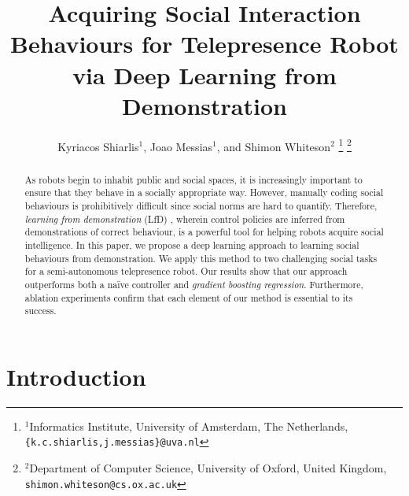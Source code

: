 \documentclass[letterpaper, 10 pt, conference]{ieeeconf}
\title{\LARGE \bf
Acquiring Social Interaction Behaviours for Telepresence Robot\\via Deep Learning from Demonstration 
}
\author{Kyriacos Shiarlis$^{1}$, Joao Messias$^{1}$, and Shimon Whiteson$^{2}$%
\thanks{$^{1}$Informatics Institute, University of Amsterdam, The Netherlands,
         {\tt\small \{k.c.shiarlis,j.messias\}@uva.nl}}%
\thanks{$^{2}$Department of Computer Science, University of Oxford, United Kingdom,
         {\tt\small shimon.whiteson@cs.ox.ac.uk}}%
}
\begin{document}
\maketitle

\thispagestyle{empty}
\pagestyle{empty}


\begin{abstract}
As robots begin to inhabit public and social spaces, it is increasingly important to ensure that they behave in a socially appropriate way. However, manually coding social behaviours is prohibitively difficult since social norms are hard to quantify.  Therefore, \emph{learning from demonstration} (LfD) \cite{argall2009survey}, wherein control policies are inferred from demonstrations of correct behaviour, is a powerful tool for helping robots acquire social intelligence. In this paper, we propose a deep learning approach to learning social behaviours from demonstration.  We apply this method to two challenging social tasks for a semi-autonomous telepresence robot.  Our results show that our approach outperforms both a naïve controller and \emph{gradient boosting regression}.  Furthermore, ablation experiments confirm that each element of our method is essential to its success.
\end{abstract}

\section{Introduction}
\end{document}
